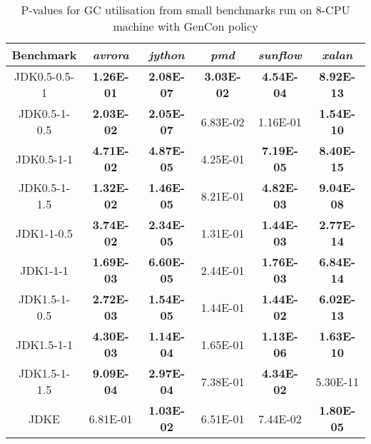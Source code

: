 \begin{table} [H]
\begin{tabular}[H]{|c|c|c|c|c|c|}
\hline
Benchmark & \emph{avrora} & \emph{jython} & \emph{pmd} & \emph{sunflow}
& \emph{xalan}\tabularnewline \hline

JDK0.5-0.5-1 & \textbf{1.26E-01} & \textbf{2.08E-07} & \textbf{3.03E-02} & \textbf{4.54E-04} &
\textbf{8.92E-13}\tabularnewline \hline

JDK0.5-1-0.5 & \textbf{2.03E-02 }& \textbf{2.05E-07} & 6.83E-02 &
1.16E-01 & \textbf{1.54E-10}\tabularnewline \hline

JDK0.5-1-1 & \textbf{4.71E-02} & \textbf{4.87E-05} & 4.25E-01 & \textbf{7.19E-05} &
\textbf{8.40E-15}\tabularnewline \hline

JDK0.5-1-1.5 & \textbf{1.32E-02} & \textbf{1.46E-05} & 8.21E-01 & \textbf{4.82E-03} &
\textbf{9.04E-08}\tabularnewline \hline

JDK1-1-0.5 &\textbf{ 3.74E-02} & \textbf{2.34E-05} & 1.31E-01 & \textbf{1.44E-03} &
\textbf{2.77E-14}\tabularnewline \hline

JDK1-1-1 & \textbf{1.69E-03} & \textbf{6.60E-05 }& 2.44E-01 & \textbf{1.76E-03} &
\textbf{6.84E-14}\tabularnewline \hline

JDK1.5-1-0.5 & \textbf{2.72E-03} & \textbf{1.54E-05} & 1.44E-01 & \textbf{1.44E-02} &
\textbf{6.02E-13}\tabularnewline \hline

JDK1.5-1-1 & \textbf{4.30E-03} & \textbf{1.14E-04} & 1.65E-01 & \textbf{1.13E-06} &
\textbf{1.63E-10}\tabularnewline \hline

JDK1.5-1-1.5 & \textbf{9.09E-04} & \textbf{2.97E-04} & 7.38E-01 & \textbf{4.34E-02} &
5.30E-11\tabularnewline \hline

JDKE & 6.81E-01 & \textbf{1.03E-02} & 6.51E-01 &
7.44E-02 & \textbf{1.80E-05}\tabularnewline \hline
\end{tabular}
\caption{P-values for GC utilisation from small benchmarks run on 8-CPU machine with GenCon policy}
\end{table}

